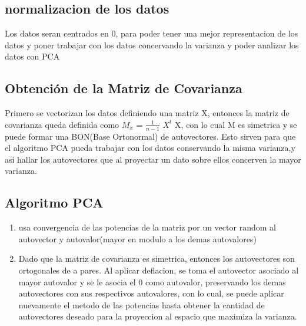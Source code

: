 \subsection{normalizacion de los datos}
Los datos seran centrados en 0, para poder tener una mejor representacion de los
datos y poner trabajar con los datos concervando la varianza y poder analizar
los datos con PCA

\subsection{Obtención de la Matriz de Covarianza}
Primero se vectorizan los datos definiendo una matriz X, entonces la matriz de
covarianza queda definida como $M_{x}$ = $\frac{1}{n-1}$ $X^{t}$ X, con lo cual
M es simetrica y se puede formar una BON(Base Ortonormal) de autovectores. Esto sirven
para que el algoritmo PCA pueda trabajar con los datos conservando la misma varianza,y asi hallar los autovectores que al proyectar un dato sobre
ellos concerven la mayor varianza.

\subsection{Algoritmo PCA}
\begin{enumerate}
Para el algoritmo PCA se utilizaran el metodo de las potencias y deflacion. 
\item usa convergencia de las potencias de la matriz por un vector random al autovector y  autovalor(mayor en modulo a los demas autovalores)
\item Dado que la matriz de covarianza es simetrica, entonces los autovectores son ortogonales de a pares. Al aplicar deflacion, se toma el autovector asociado al mayor autovalor y se le asocia el 0 como autovalor, preservando los demas autovectores con sus respectivos autovalores, con lo cual, se puede aplicar nuevamente el metodo de las potencias hasta obtener la cantidad de autovectores deseado para la proyeccion al espacio que maximiza la varianza.

\end{enumerate}


